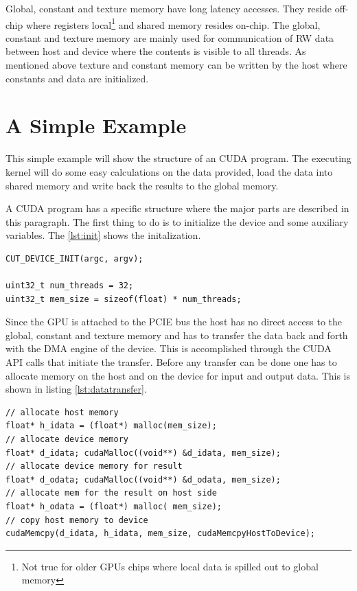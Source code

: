 Global, constant and texture memory have long latency accesses. They reside
off-chip where registers local\footnote{Not true for older \glspl{GPU} chips
where local data is spilled out to global memory} and shared memory resides
on-chip. The global, constant and texture memory are mainly used for
communication of \gls{RW} data between host and device where the contents is
visible to all threads. As mentioned above texture and constant memory can be
written by the host where constants and data are initialized.


\section{A Simple Example}%
\label{sub:a_simple_example} 
This simple example will show the structure of an \gls{CUDA} program. The executing
kernel will do some easy calculations on the data provided, load the data into
shared memory  and write back the results to the global memory. 

A \gls{CUDA} program has a specific structure where the major parts are
described in this paragraph. The first thing to do is to initialize the device
and some auxiliary variables. The \autoref{lst:init} shows the
initalization.

%
\begin{lstlisting}[caption=Hardware initalization, label=lst:init]
CUT_DEVICE_INIT(argc, argv);

uint32_t num_threads = 32;
uint32_t mem_size = sizeof(float) * num_threads;				
\end{lstlisting} 
%

Since the \gls{GPU} is attached to the \gls{PCIE} bus the host has no direct
access to the global, constant and texture memory and has to transfer the data
back and forth with the \gls{DMA} engine of the device. This is accomplished
through the \gls{CUDA} \gls{API} calls that initiate the transfer. Before any
transfer can be done one has to allocate memory on the host and on the device
for input and output data. This is shown in listing \autoref{lst:datatransfer}.


\begin{lstlisting}[caption=Data transfer of data, label=lst:datatransfer]
// allocate host memory 
float* h_idata = (float*) malloc(mem_size);
// allocate device memory 
float* d_idata; cudaMalloc((void**) &d_idata, mem_size);
// allocate device memory for result
float* d_odata; cudaMalloc((void**) &d_odata, mem_size);
// allocate mem for the result on host side
float* h_odata = (float*) malloc( mem_size);
// copy host memory to device 
cudaMemcpy(d_idata, h_idata, mem_size, cudaMemcpyHostToDevice);
\end{lstlisting} 


